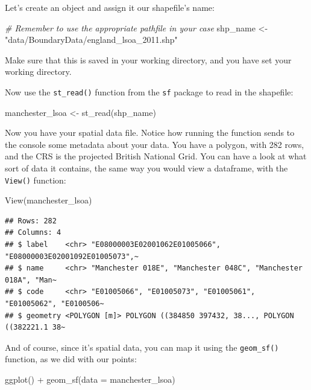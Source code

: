 \documentclass[
]{book}
\makeatletter
\newenvironment{Shaded}{\begin{snugshade}}{\end{snugshade}}
\newcommand{\AttributeTok}[1]{\textcolor[rgb]{0.61,0.61,0.61}{#1}}
\newcommand{\CommentTok}[1]{\textcolor[rgb]{0.37,0.37,0.37}{\textit{#1}}}
\newcommand{\FunctionTok}[1]{\textcolor[rgb]{0,0,0}{#1}}
\newcommand{\NormalTok}[1]{#1}
\newcommand{\OtherTok}[1]{\textcolor[rgb]{0.37,0.37,0.37}{#1}}
\newcommand{\SpecialCharTok}[1]{\textcolor[rgb]{0,0,0}{#1}}
\newcommand{\StringTok}[1]{\textcolor[rgb]{0.5,0.5,0.5}{#1}}
\newenvironment{kframe}{%
\medskip{}
\setlength{\fboxsep}{.8em}
 \def\at@end@of@kframe{}%
 \ifinner\ifhmode%
  \def\at@end@of@kframe{\end{minipage}}%
  \begin{minipage}{\columnwidth}%
 \fi\fi%
 \def\FrameCommand##1{\hskip\@totalleftmargin \hskip-\fboxsep
 \colorbox{shadecolor}{##1}\hskip-\fboxsep
     \hskip-\linewidth \hskip-\@totalleftmargin \hskip\columnwidth}%
 \MakeFramed {\advance\hsize-\width
   \@totalleftmargin\z@ \linewidth\hsize
   \@setminipage}}%
 {\par\unskip\endMakeFramed%
 \at@end@of@kframe}
\renewenvironment{Shaded}{\begin{kframe}}{\end{kframe}}
\makeatother
\begin{document}
Let's create an object and assign it our shapefile's name:

\begin{Shaded}
\begin{Highlighting}[]
\CommentTok{\# Remember to use the appropriate pathfile in your case}
\NormalTok{shp\_name }\OtherTok{\textless{}{-}} \StringTok{"data/BoundaryData/england\_lsoa\_2011.shp"}
\end{Highlighting}
\end{Shaded}

Make sure that this is saved in your working directory, and you have set your working directory.

Now use the \texttt{st\_read()} function from the \texttt{sf} package to read in the shapefile:

\begin{Shaded}
\begin{Highlighting}[]
\NormalTok{manchester\_lsoa }\OtherTok{\textless{}{-}} \FunctionTok{st\_read}\NormalTok{(shp\_name)}
\end{Highlighting}
\end{Shaded}

Now you have your spatial data file. Notice how running the function sends to the console some metadata about your data. You have a polygon, with 282 rows, and the CRS is the projected British National Grid. You can have a look at what sort of data it contains, the same way you would view a dataframe, with the \texttt{View()} function:

\begin{Shaded}
\begin{Highlighting}[]
\FunctionTok{View}\NormalTok{(manchester\_lsoa)}
\end{Highlighting}
\end{Shaded}

\begin{verbatim}
## Rows: 282
## Columns: 4
## $ label    <chr> "E08000003E02001062E01005066", "E08000003E02001092E01005073",~
## $ name     <chr> "Manchester 018E", "Manchester 048C", "Manchester 018A", "Man~
## $ code     <chr> "E01005066", "E01005073", "E01005061", "E01005062", "E0100506~
## $ geometry <POLYGON [m]> POLYGON ((384850 397432, 38..., POLYGON ((382221.1 38~
\end{verbatim}

And of course, since it's spatial data, you can map it using the \texttt{geom\_sf()} function, as we did with our points:

\begin{Shaded}
\begin{Highlighting}[]
\FunctionTok{ggplot}\NormalTok{() }\SpecialCharTok{+} 
  \FunctionTok{geom\_sf}\NormalTok{(}\AttributeTok{data =}\NormalTok{ manchester\_lsoa)}
\end{Highlighting}
\end{Shaded}
\end{document}
